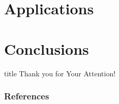\documentclass[aspectratio=169,fleqn]{beamer}
\begin{document}
\section{Applications}

\section{Conclusions}


\setcounter{backupcounter}{\value{framenumber}}

\begin{frame}[plain]
  \vfill
  \centering
  \begin{beamercolorbox}[sep=8pt,center,shadow=true,rounded=true]{title}
    Thank you for Your Attention!%
    \par%
  \end{beamercolorbox}
  \vfill
\end{frame}

\begin{frame}[plain]
  \frametitle{References}
  \AtNextBibliography{\tiny}
  \begin{multicols}{2}
    \nocite{*}
    \printbibliography
  \end{multicols}
\end{frame}

\setcounter{framenumber}{\value{backupcounter}}
\end{document}
